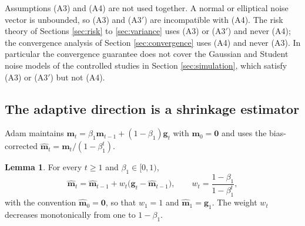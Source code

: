 \documentclass[a4paper,fleqn]{cas-sc}
\theoremstyle{plain}
\theoremstyle{definition}
\newtheorem{lemma}{Lemma}
\theoremstyle{remark}
\newenvironment{revblock}{}{}
\begin{document}
Assumptions (A3) and (A4) are not used together. A normal or elliptical noise vector is unbounded, so (A3) and (A3$'$) are incompatible with (A4). The risk theory of Sections \ref{sec:risk} to \ref{sec:variance} uses (A3) or (A3$'$) and never (A4); the convergence analysis of Section \ref{sec:convergence} uses (A4) and never (A3). In particular the convergence guarantee does not cover the Gaussian and Student noise models of the controlled studies in Section \ref{sec:simulation}, which satisfy (A3) or (A3$'$) but not (A4).

\subsection{The adaptive direction is a shrinkage estimator}

Adam maintains $\bm m_t=\beta_1\bm m_{t-1}+(1-\beta_1)\bm g_t$ with $\bm m_0=\bm 0$ and uses the bias-corrected $\hat{\bm m}_t=\bm m_t/(1-\beta_1^{t})$.

\begin{lemma}
\label{lem:adam_identity}
For every $t\ge1$ and $\beta_1\in[0,1)$,
\begin{equation}
\hat{\bm m}_t=\hat{\bm m}_{t-1}+w_t\bigl(\bm g_t-\hat{\bm m}_{t-1}\bigr),
\qquad
w_t=\frac{1-\beta_1}{1-\beta_1^{t}},
\end{equation}
with the convention $\hat{\bm m}_0=\bm 0$, so that $w_1=1$ and $\hat{\bm m}_1=\bm g_1$. The weight $w_t$ decreases monotonically from one to $1-\beta_1$.
\end{lemma}
\end{document}
